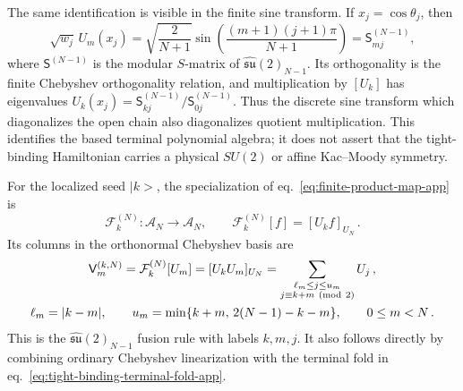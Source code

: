 \documentclass[a4paper,11pt]{article}
\def\ket#1{|#1>}%
\theoremstyle{definition}
\theoremstyle{remark}
\newcommand{\ket}[1]{|#1\rangle}
\newcommand{\cA}{\mathcal A}
\newcommand{\cF}{\mathcal F}
\begin{document}
The same identification is visible in the finite sine transform.  If
$x_j=\cos\theta_j$, then
\begin{equation}
   \sqrt{w_j}\,U_m(x_j)
   =
   \sqrt{\frac{2}{N+1}}
   \sin\!\left(\frac{(m+1)(j+1)\pi}{N+1}\right)
   =\mathsf S_{mj}^{(N-1)},
   \label{eq:tight-binding-Verlinde-S-app}
\end{equation}
where $\mathsf S^{(N-1)}$ is the modular $S$-matrix of
$\widehat{\mathfrak{su}}(2)_{N-1}$.  Its orthogonality is the finite
Chebyshev orthogonality relation, and multiplication by $[U_k]$ has
eigenvalues
$U_k(x_j)=\mathsf S_{kj}^{(N-1)}/\mathsf S_{0j}^{(N-1)}$.
Thus the discrete sine transform which diagonalizes the open chain also
diagonalizes quotient multiplication.  This identifies the based
terminal polynomial algebra; it does not assert that the tight-binding
Hamiltonian carries a physical $SU(2)$ or affine Kac--Moody symmetry.

For the localized seed $\ket k$, the specialization of
eq.~\eqref{eq:finite-product-map-app} is
\begin{equation}
   \cF_k^{(N)}:\cA_N\longrightarrow\cA_N,
   \qquad
   \cF_k^{(N)}[f]=[U_kf]_{U_N}\,.
   \label{eq:tight-binding-seed-multiplication-app}
\end{equation}
Its columns in the orthonormal Chebyshev basis are 
\begin{equation}
\begin{gathered}
   \mathsf V_m^{(k,N)}
   ={\cF}_k^{(N)}[U_m]
   =[U_kU_m]_{U_N}
   =\sum_{\substack{\ell_m\le j\le u_m\\
                    j\equiv k+m\ ({\rm mod}\ 2)}}U_j\,,\\
   \ell_m=|k-m|,
   \qquad
   u_m=\min\{k+m,\,2(N-1)-k-m\},
   \qquad 0\le m<N\,.
\end{gathered}
   \label{eq:tight-binding-fusion-product-app}
\end{equation}
This is the $\widehat{\mathfrak{su}}(2)_{N-1}$ fusion rule with labels
$k,m,j$.  It also follows directly by combining ordinary Chebyshev
linearization with the terminal fold in
eq.~\eqref{eq:tight-binding-terminal-fold-app}.
\end{document}
